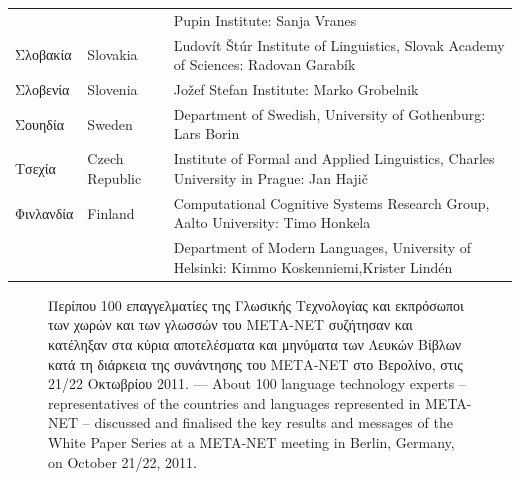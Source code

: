\begin{longtable}{@{}llp{113mm}@{}}
  & & Pupin Institute: Sanja Vranes \\ \addlinespace  
  Σλοβακία & \textcolor{grey1}{Slovakia} & Ľudovít Štúr Institute of Linguistics, Slovak Academy of Sciences: Radovan Garabík \\ \addlinespace 
  Σλοβενία & \textcolor{grey1}{Slovenia} & Jožef Stefan Institute: Marko Grobelnik \\ \addlinespace 
  Σουηδία & \textcolor{grey1}{Sweden} & Department of Swedish, University of Gothenburg: Lars Borin \\ \addlinespace 
  Τσεχία & \textcolor{grey1}{Czech Republic} & Institute of Formal and Applied Linguistics, Charles University in Prague: Jan Hajič \\ \addlinespace
  Φινλανδία & \textcolor{grey1}{Finland} & Computational Cognitive Systems Research Group, Aalto University: Timo Honkela\\ \addlinespace
  & & Department of Modern Languages, University of Helsinki: Kimmo Koskenniemi,\newline Krister Lindén 
\end{longtable}
\normalsize

\renewcommand*{\figureformat}{}
\renewcommand*{\captionformat}{}

\begin{figure}[htbp]
  \center
  \caption{Περίπου 100 επαγγελματίες της Γλωσικής Τεχνολογίας και εκπρόσωποι των χωρών και των γλωσσών του ΜΕΤΑ-ΝΕΤ συζήτησαν και κατέληξαν στα κύρια αποτελέσματα και μηνύματα των Λευκών Βίβλων κατά τη διάρκεια της συνάντησης του ΜΕΤΑ-ΝΕΤ στο Βερολίνο, στις 21/22 Οκτωβρίου 2011. --- \textcolor{grey1}{About 100 language technology experts -- representatives of the countries and languages represented in META-NET -- discussed and finalised the key results and messages of the White Paper Series at a META-NET meeting in Berlin, Germany, on October 21/22, 2011.}}
  \medskip
\end{figure}

\cleardoublepage

\label{whitepaperseries}

